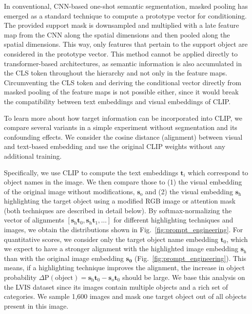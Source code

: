 In conventional, CNN-based one-shot semantic segmentation, masked pooling \cite{shaban17} has emerged as a standard technique to compute a prototype vector for conditioning. The provided support mask is downsampled and multiplied with a late feature map from the CNN along the spatial dimensions and then pooled along the spatial dimensions. This way, only features that pertain to the support object are considered in the prototype vector.
This method cannot be applied directly to transformer-based architectures, as semantic information is also accumulated in the CLS token throughout the hierarchy and not only in the feature maps. 
Circumventing the CLS token and deriving the conditional vector directly from masked pooling of the feature maps is not possible either, since it would break the compatibility between text embeddings and visual embeddings of CLIP.

To learn more about how target information can be incorporated into CLIP, we compare several variants in a simple experiment without segmentation and its confounding effects.
We consider the cosine distance (alignment) between visual and text-based embedding and use the original CLIP weights without any additional training.

Specifically, we use CLIP to compute the text embeddings $\mathbf{t}_i$ which correspond to object names in the image. We then compare those to (1) the visual embedding of the original image without modifications, $\mathbf{s}_{\text{o}}$ and (2) the visual embedding $\mathbf{s}_{\text{h}}$ highlighting the target object using a modified RGB image or attention mask (both techniques are described in detail below).
By softmax-normalizing the vector of alignments $[\mathbf{s}_{\text{h}} \mathbf{t}_0, \mathbf{s}_{\text{h}} \mathbf{t}_1, \dots]$ for different highlighting techniques and images, we obtain the distributions shown in Fig.~\ref{fig:prompt_engineering}.
For quantitative scores, we consider only the target object name embedding $\mathbf{t}_0$, which we expect to have a stronger alignment with the highlighted image embedding $\mathbf{s}_{\text{h}}$ than with the original image embedding $\mathbf{s_0}$ (Fig.~\ref{fig:prompt_engineering}). This means, if a highlighting technique improves the alignment, the increase in object probability $\Delta \text{P}(\text{object}) = \mathbf{s}_{\text{h}} \mathbf{t}_0  - \mathbf{s}_{o} \mathbf{t}_0 $ should be large.
We base this analysis on the LVIS dataset \cite{gupta19lvis} since its images contain multiple objects and a rich set of categories. We sample 1,600 images and mask one target object out of all objects present in this image. 

